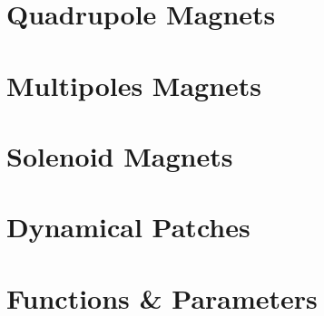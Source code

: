 \documentclass{cern-art} %
\begin{document}
\section{Quadrupole Magnets}

\section{Multipoles Magnets}

\section{Solenoid Magnets}

\section{Dynamical Patches}

\section{Functions \& Parameters}
\end{document}

